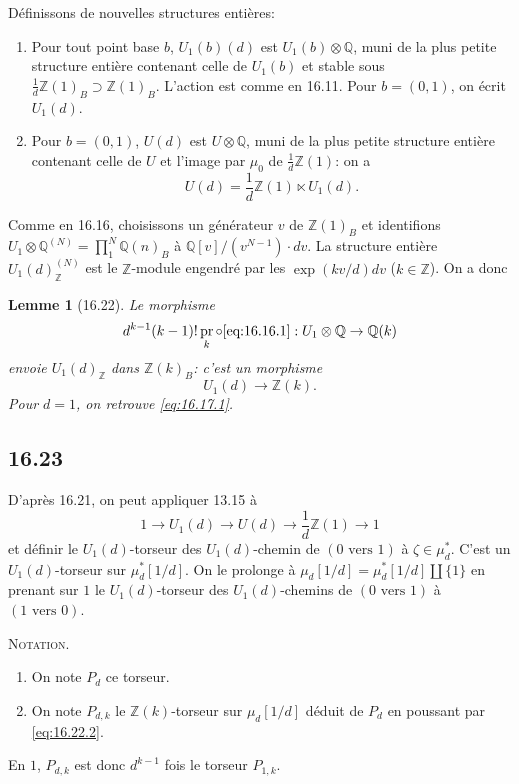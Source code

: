 \documentclass[12pt,a4paper]{article}
\theoremstyle{plain}
\newtheorem{lemma}[theorem]{Lemme}
\theoremstyle{definition}
\theoremstyle{remark}
\DeclareMathOperator{\pr}{pr}
\newcommand{\Betti}{B}
\newcommand{\ZZ}{\mathbb{Z}}
\newcommand{\QQ}{\mathbb{Q}}
\begin{document}
D\'efinissons de nouvelles structures enti\`eres:
\begin{enumerate}
\item[(a)] Pour tout point base $b$, $U_1(b)(d)$ est $U_1(b) \otimes \QQ$,
muni de la plus petite structure enti\`ere contenant celle de $U_1(b)$
et stable sous $\frac{1}{d}\ZZ(1)_\Betti \supset \ZZ(1)_\Betti$. L'action
est comme en 16.11. Pour $b = (0,1)$, on \'ecrit $U_1(d)$.
\item[(b)] Pour $b = (0,1)$, $U(d)$ est $U \otimes \QQ$, muni de la plus
petite structure enti\`ere contenant celle de $U$ et l'image par
$\mu_0$ de $\frac{1}{d}\ZZ(1)$: on a
\begin{equation}\label{eq:16.21.1}
U(d) = \frac{1}{d}\ZZ(1) \ltimes U_1(d).
\end{equation}
\end{enumerate}

Comme en 16.16, choisissons un g\'en\'erateur $v$ de $\ZZ(1)_\Betti$ et
identifions $U_1 \otimes \QQ^{(N)} = \prod_1^N \QQ(n)_\Betti$ \`a
$\QQ[v]/(v^{N-1}) \cdot dv$. La structure enti\`ere
$U_1(d)_\ZZ^{(N)}$ est le $\ZZ$-module engendr\'e par les
$\exp(kv/d)dv$ ($k \in \ZZ$). On a donc

\begin{lemma}[16.22]\label{lem:16.22}
Le morphisme
\begin{equation}\label{eq:16.22.1}
d^{k-1}(k-1)! \pr_k \circ \text{\eqref{eq:16.16.1}} : U_1 \otimes \QQ \to \QQ(k)
\end{equation}
envoie $U_1(d)_\ZZ$ dans $\ZZ(k)_\Betti$: c'est un morphisme
\begin{equation}\label{eq:16.22.2}
U_1(d) \to \ZZ(k).
\end{equation}
Pour $d=1$, on retrouve \eqref{eq:16.17.1}.
\end{lemma}

\subsection*{16.23}

D'apr\`es 16.21, on peut appliquer 13.15 \`a
\[
1 \to U_1(d) \to U(d) \to \frac{1}{d}\ZZ(1) \to 1
\]
et d\'efinir le $U_1(d)$-torseur des $U_1(d)$-chemin de
$(0 \text{ vers } 1)$ \`a $\zeta \in \mu_d^*$. C'est un $U_1(d)$-torseur
sur $\mu_d^*[1/d]$. On le prolonge \`a
$\mu_d[1/d] = \mu_d^*[1/d] \amalg \{1\}$ en prenant sur $1$ le
$U_1(d)$-torseur des $U_1(d)$-chemins de $(0 \text{ vers } 1)$ \`a
$(1 \text{ vers } 0)$.

\noindent \textsc{Notation.}
\begin{enumerate}
\item[(i)] On note $P_d$ ce torseur.
\item[(ii)] On note $P_{d,k}$ le $\ZZ(k)$-torseur sur $\mu_d[1/d]$
d\'eduit de $P_d$ en poussant par \eqref{eq:16.22.2}.
\end{enumerate}
En $1$, $P_{d,k}$ est donc $d^{k-1}$ fois le torseur $P_{1,k}$.
\end{document}
